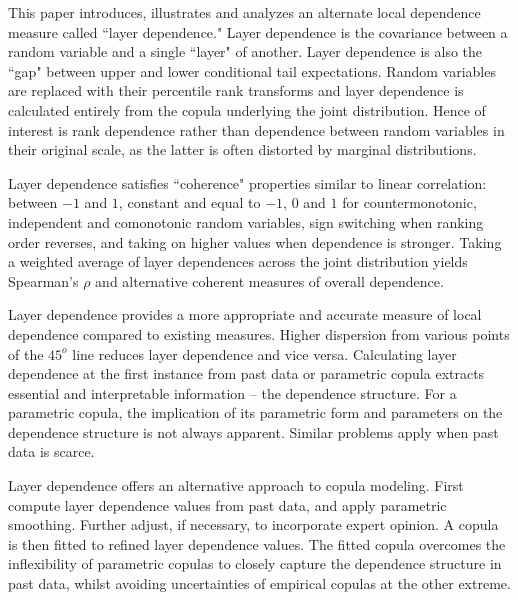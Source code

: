 \documentclass[authoryear]{elsarticle}
\begin{document}
This paper introduces, illustrates and analyzes an alternate local dependence measure called  ``layer dependence." Layer dependence is the covariance between a random variable and a single ``layer" of another. Layer dependence is also the ``gap" between upper and lower conditional tail expectations. Random variables are replaced with their percentile rank transforms and layer dependence is calculated entirely from the copula underlying the joint distribution. Hence of interest is rank dependence rather than dependence between random variables in their original scale, as the latter is often distorted by marginal distributions.


Layer dependence satisfies ``coherence" properties similar to linear correlation: between $-1$ and $1$, constant and equal to $-1$, $0$ and $1$ for countermonotonic, independent and comonotonic random variables, sign switching when ranking order reverses, and taking on higher values when dependence is stronger. Taking a weighted average of layer dependences across the joint distribution yields Spearman's $\rho$ and alternative coherent measures of overall dependence.


Layer dependence provides a more appropriate and accurate measure of local dependence compared to existing measures. Higher dispersion from various points of the $45^o$ line reduces layer dependence and vice versa. Calculating layer dependence at the first instance from past data or parametric copula extracts essential and interpretable information -- the dependence structure. For a parametric copula, the implication of its parametric form and parameters on the dependence structure is not always apparent. Similar problems apply when past data is scarce.


Layer dependence offers an alternative approach to copula modeling. First compute layer dependence values from past data, and apply parametric smoothing. Further adjust, if necessary, to incorporate expert opinion. A copula is then fitted to refined layer dependence values. The fitted copula overcomes the inflexibility of parametric copulas to closely capture the dependence structure in past data, whilst avoiding uncertainties of empirical copulas at the other extreme.
\end{document}
